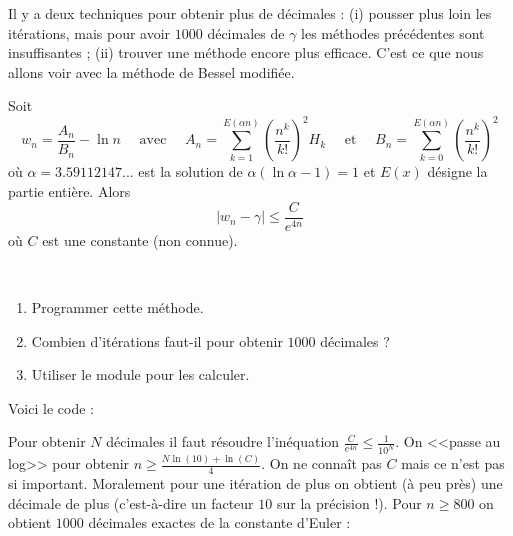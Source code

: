 \documentclass[class=report,crop=false]{standalone}
\begin{document}
Il y a deux techniques pour obtenir plus de décimales : (i) pousser plus loin les itérations,
mais pour avoir $1000$ décimales de $\gamma$ les méthodes précédentes sont insuffisantes ;
(ii) trouver une méthode encore plus efficace. C'est ce que nous allons voir avec
la méthode de Bessel modifiée.

Soit
$$w_n = \frac{A_n}{B_n} - \ln n
\quad \text{ avec } \quad
A_n =\sum_{k=1}^{E(\alpha n)} \left( \frac{n^k}{k!} \right)^2 H_k
 \quad \text{ et } \quad
B_n =\sum_{k=0}^{E(\alpha n)} \left( \frac{n^k}{k!} \right)^2
$$
où $\alpha = 3.59112147...$ est la solution de $\alpha(\ln \alpha - 1)=1$ et
$E(x)$ désigne la partie entière.
Alors
$$|w_n - \gamma| \le \frac{C}{e^{4n}}$$
où $C$ est une constante (non connue).


\begin{tp}~
\begin{enumerate}
  \item Programmer cette méthode.
  \item Combien d'itérations faut-il pour obtenir $1000$ décimales ?
  \item Utiliser le module  pour les calculer.
\end{enumerate}
\end{tp}

Voici le code :

Pour obtenir $N$ décimales il faut résoudre l'inéquation $\frac{C}{e^{4n}} \le \frac{1}{10^{N}}$.
On <<passe au log>> pour obtenir $n \ge \frac{N \ln(10)+\ln(C)}{4}$. On ne connaît pas $C$ mais
ce n'est pas si important. Moralement pour une itération de plus on obtient (à peu près) une décimale
de plus (c'est-à-dire un facteur $10$ sur la précision !). Pour $n \ge 800$ on obtient $1000$ décimales exactes de la
constante d'Euler :
\end{document}

